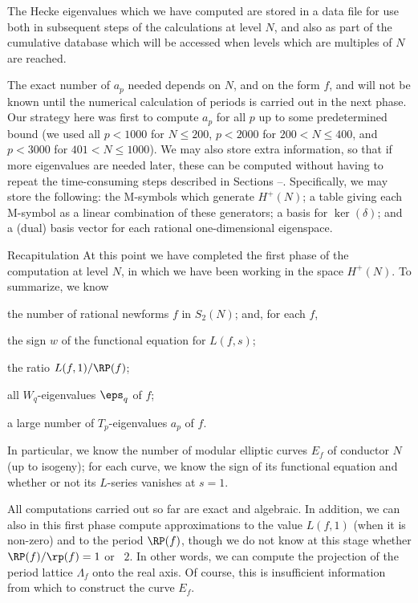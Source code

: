 The Hecke eigenvalues which we have computed are stored in a data file for
use both in subsequent steps of the calculations at level $N$, and also as
part of the cumulative database which will be accessed when levels which
are multiples of $N$ are reached.

The exact number of $a_p$ needed depends on $N$, and on the form $f$,
and will not be known until the numerical calculation of periods is
carried out in the next phase.  Our strategy here was first to compute
$a_p$ for all $p$ up to some predetermined bound (we used all $p<1000$
for $N\le 200$, $p<2000$ for $200<N\le400$, and $p<3000$ for $401<N\le
1000$). We may also store extra information, so that if more
eigenvalues are needed later, these can be computed without having to
repeat the time-consuming steps described in Sections \Homol--\Split.
Specifically, we may store the following: the M-symbols which generate
$H^+(N)$; a table giving each M-symbol as a linear combination of
these generators; a basis for $\ker(\delta)$; and a (dual) basis
vector for each rational one-dimensional eigenspace.

\subhead Recapitulation
\endsubhead
At this point we have completed the first
phase of the computation at level $N$, in which we have been working in the
space $H^{+}(N)$.   To summarize, we know
\roster
\item the number of rational newforms $f$ in $S_2(N)$; and, for each $f$,
\item the sign $w$ of the functional equation for $L(f,s)$;
\item the ratio $L(f,1)/\RP(f)$;
\item all $W_q$-eigenvalues $\eps_q$ of $f$;
\item a large number of $T_p$-eigenvalues $a_p$ of $f$.
\endroster

In particular, we know the number of modular elliptic curves $E_f$ of
conductor $N$ (up to isogeny); for each curve, we know the sign of its
functional equation and whether or not its $L$-series vanishes at
$s=1$. 

All computations carried out so far are exact and algebraic.  In
addition, we can also in this first phase compute approximations to
the value $L(f,1)$ (when it is non-zero) and to the period $\RP(f)$,
though we do not know at this stage whether $\RP(f)/\rp(f)=1$ or ~$2$.
In other words, we can compute the projection of the period lattice
$\Lambda_f$ onto the real axis.  Of course, this is insufficient
information from which to construct the curve $E_f$.

